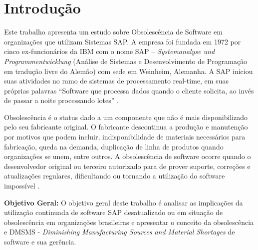 \section{\esp Introdução}

Este trabalho apresenta um estudo sobre Obsolescência de Software em organizações que utilizam Sistemas SAP. A empresa foi fundada em 1972 por cinco ex-funcionários da IBM com o nome SAP – \textit{Systemanalyse und Programmentwicklung} (Análise de Sistemas e Desenvolvimento de Programação em tradução livre do Alemão) com sede em Weinheim, Alemanha. A SAP iniciou suas atividades no ramo de sistemas de processamento real-time, em suas próprias palavras “Software que processa dados quando o cliente solicita, ao invés de passar a noite processando lotes” \cite{sapse}.

Obsolescência é o status dado a um componente que não é mais disponibilizado pelo seu fabricante original. O fabricante descontinua a produção e manutenção por motivos que podem incluir, indisponibilidade de materiais necessários para fabricação, queda na demanda, duplicação de linha de produtos quando organizações se unem, entre outros. 
A obsolescência de software ocorre quando o desenvolvedor original ou terceiro autorizado para de prover suporte, correções e atualizações regulares, dificultando ou tornando a utilização do software impossível \cite{rajagopala}.

\textbf{Objetivo Geral: }
O objetivo geral deste trabalho é analisar as implicações da utilização continuada de software SAP desatualizado ou em situação de obsolescência em organizações brasileiras e apresentar o conceito da obsolescência e DMSMS - \textit{Diminishing Manufacturing Sources and Material Shortages} de software e sua gerência.

